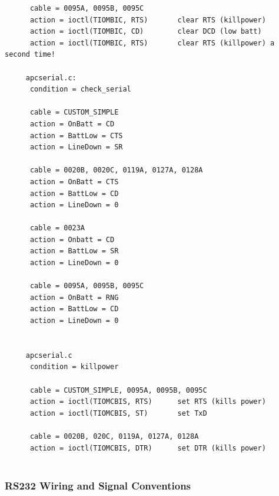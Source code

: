 {{{{{{{{{{\begin{verbatim}
      cable = 0095A, 0095B, 0095C
      action = ioctl(TIOMBIC, RTS)       clear RTS (killpower)
      action = ioctl(TIOMBIC, CD)        clear DCD (low batt)
      action = ioctl(TIOMBIC, RTS)       clear RTS (killpower) a second time!
     
     apcserial.c:
      condition = check_serial
     
      cable = CUSTOM_SIMPLE
      action = OnBatt = CD
      action = BattLow = CTS
      action = LineDown = SR
     
      cable = 0020B, 0020C, 0119A, 0127A, 0128A
      action = OnBatt = CTS
      action = BattLow = CD
      action = LineDown = 0
     
      cable = 0023A
      action = Onbatt = CD
      action = BattLow = SR
      action = LineDown = 0
     
      cable = 0095A, 0095B, 0095C
      action = OnBatt = RNG
      action = BattLow = CD
      action = LineDown = 0
     
     
     apcserial.c
      condition = killpower
     
      cable = CUSTOM_SIMPLE, 0095A, 0095B, 0095C
      action = ioctl(TIOMCBIS, RTS)      set RTS (kills power)
      action = ioctl(TIOMCBIS, ST)       set TxD
     
      cable = 0020B, 020C, 0119A, 0127A, 0128A
      action = ioctl(TIOMCBIS, DTR)      set DTR (kills power)
     
\end{verbatim}
\normalsize

\label{RS232-Wiring-and-Signal-Conventions}

\subsubsection*{RS232 Wiring and Signal Conventions}

\label{index-Cables-216}

}}}}}}}}}}
